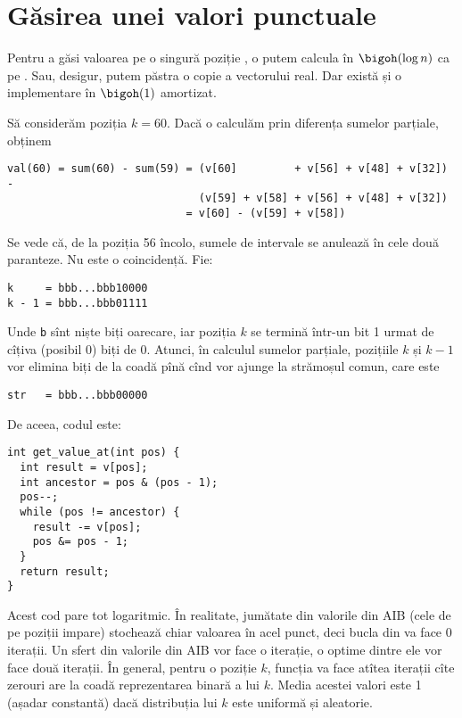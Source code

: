 \section{Găsirea unei valori punctuale}

Pentru a găsi valoarea pe o singură poziție , o putem calcula în $\bigoh(\log n)$ ca pe . Sau, desigur, putem păstra o copie a vectorului real. Dar există și o implementare în $\bigoh(1)$ amortizat.

Să considerăm poziția $k = 60$. Dacă o calculăm prin diferența sumelor parțiale, obținem

\begin{verbatim}
val(60) = sum(60) - sum(59) = (v[60]         + v[56] + v[48] + v[32]) -
                              (v[59] + v[58] + v[56] + v[48] + v[32])
                            = v[60] - (v[59] + v[58])
\end{verbatim}

Se vede că, de la poziția 56 încolo, sumele de intervale se anulează în cele două paranteze. Nu este o coincidență. Fie:

\begin{verbatim}
k     = bbb...bbb10000
k - 1 = bbb...bbb01111
\end{verbatim}

Unde \texttt{b} sînt niște biți oarecare, iar poziția $k$ se termină într-un bit 1 urmat de cîțiva (posibil 0) biți de 0. Atunci, în calculul sumelor parțiale, pozițiile $k$ și $k - 1$ vor elimina biți de la coadă pînă cînd vor ajunge la strămoșul comun, care este

\begin{verbatim}
str   = bbb...bbb00000
\end{verbatim}

De aceea, codul este:

\begin{verbatim}
int get_value_at(int pos) {
  int result = v[pos];
  int ancestor = pos & (pos - 1);
  pos--;
  while (pos != ancestor) {
    result -= v[pos];
    pos &= pos - 1;
  }
  return result;
}
\end{verbatim}

Acest cod pare tot logaritmic. În realitate, jumătate din valorile din AIB (cele de pe poziții impare) stochează chiar valoarea în acel punct, deci bucla din  va face 0 iterații. Un sfert din valorile din AIB vor face o iterație, o optime dintre ele vor face două iterații. În general, pentru o poziție $k$, funcția  va face atîtea iterații cîte zerouri are la coadă reprezentarea binară a lui $k$. Media acestei valori este 1 (așadar constantă) dacă distribuția lui $k$ este uniformă și aleatorie.

